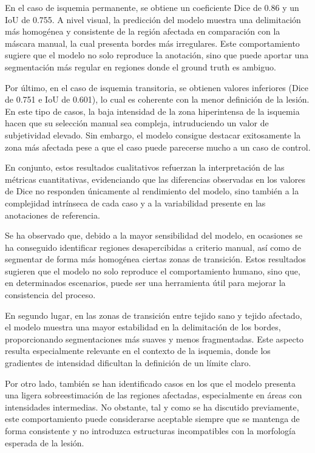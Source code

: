 En el caso de isquemia permanente, se obtiene un coeficiente Dice de 0.86 y un IoU de 0.755. A nivel visual, la predicción del modelo muestra una delimitación más homogénea y consistente de la región afectada en comparación con la máscara manual, la cual presenta bordes más irregulares. Este comportamiento sugiere que el modelo no solo reproduce la anotación, sino que puede aportar una segmentación más regular en regiones donde el ground truth es ambiguo.

Por último, en el caso de isquemia transitoria, se obtienen valores inferiores (Dice de 0.751 e IoU de 0.601), lo cual es coherente con la menor definición de la lesión. En este tipo de casos, la baja intensidad de la zona hiperintensa de la isquemia hacen que su selección manual sea compleja, intruduciendo un valor de subjetividad elevado. Sin embargo, el modelo consigue destacar exitosamente la zona más afectada pese a que el caso puede parecerse mucho a un caso de control.

En conjunto, estos resultados cualitativos refuerzan la interpretación de las métricas cuantitativas, evidenciando que las diferencias observadas en los valores de Dice no responden únicamente al rendimiento del modelo, sino también a la complejidad intrínseca de cada caso y a la variabilidad presente en las anotaciones de referencia.

Se ha observado que, debido a la mayor sensibilidad del modelo, en ocasiones se ha conseguido identificar regiones desapercibidas a criterio manual, así como de segmentar de forma más homogénea ciertas zonas de transición. Estos resultados sugieren que el modelo no solo reproduce el comportamiento humano, sino que, en determinados escenarios, puede ser una herramienta útil para mejorar la consistencia del proceso.

En segundo lugar, en las zonas de transición entre tejido sano y tejido afectado, el modelo muestra una mayor estabilidad en la delimitación de los bordes, proporcionando segmentaciones más suaves y menos fragmentadas. Este aspecto resulta especialmente relevante en el contexto de la isquemia, donde los gradientes de intensidad dificultan la definición de un límite claro.

Por otro lado, también se han identificado casos en los que el modelo presenta una ligera sobreestimación de las regiones afectadas, especialmente en áreas con intensidades intermedias. No obstante, tal y como se ha discutido previamente, este comportamiento puede considerarse aceptable siempre que se mantenga de forma consistente y no introduzca estructuras incompatibles con la morfología esperada de la lesión.

